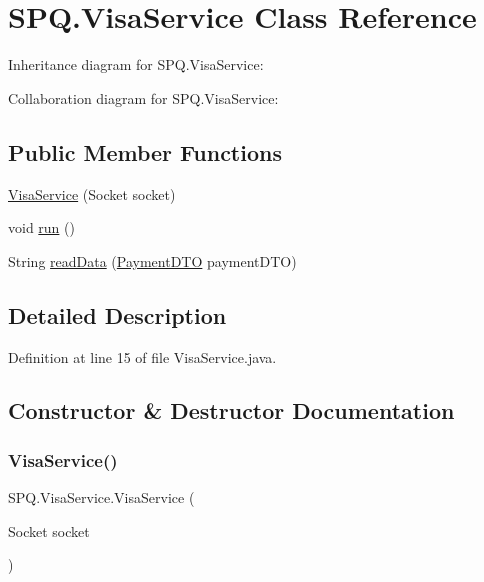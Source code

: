 \hypertarget{class_s_p_q_1_1_visa_service}{}\section{S\+P\+Q.\+Visa\+Service Class Reference}
\label{class_s_p_q_1_1_visa_service}


Inheritance diagram for S\+P\+Q.\+Visa\+Service\+:


Collaboration diagram for S\+P\+Q.\+Visa\+Service\+:
\subsection*{Public Member Functions}
\begin{DoxyCompactItemize}
\item 
\mbox{\hyperlink{class_s_p_q_1_1_visa_service_a18a0c5b945cf8164f1069230db5ddc91}{Visa\+Service}} (Socket socket)
\item 
void \mbox{\hyperlink{class_s_p_q_1_1_visa_service_a4e9434dfb98d1ff247d29794ac96909e}{run}} ()
\item 
String \mbox{\hyperlink{class_s_p_q_1_1_visa_service_a9f06022375e8bd98b78a8268bdc4ff05}{read\+Data}} (\mbox{\hyperlink{class_s_p_q_1_1dto_1_1_payment_d_t_o}{Payment\+D\+TO}} payment\+D\+TO)
\end{DoxyCompactItemize}


\subsection{Detailed Description}


Definition at line 15 of file Visa\+Service.\+java.



\subsection{Constructor \& Destructor Documentation}
\mbox{\label{class_s_p_q_1_1_visa_service_a18a0c5b945cf8164f1069230db5ddc91}} 
\subsubsection{\texorpdfstring{Visa\+Service()}{VisaService()}}
{\footnotesize\ttfamily S\+P\+Q.\+Visa\+Service.\+Visa\+Service (\begin{DoxyParamCaption}\item[{Socket}]{socket }\end{DoxyParamCaption})}



